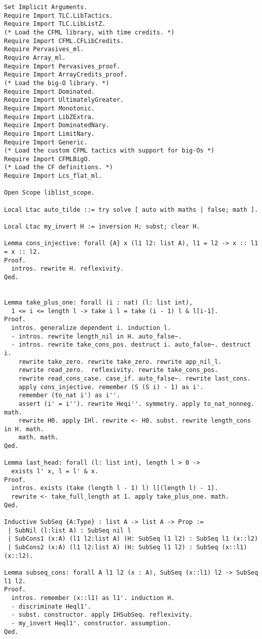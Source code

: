 \begin{verbatim}
Set Implicit Arguments.
Require Import TLC.LibTactics.
Require Import TLC.LibListZ.
(* Load the CFML library, with time credits. *)
Require Import CFML.CFLibCredits.
Require Pervasives_ml.
Require Array_ml.
Require Import Pervasives_proof.
Require Import ArrayCredits_proof.
(* Load the big-O library. *)
Require Import Dominated.
Require Import UltimatelyGreater.
Require Import Monotonic.
Require Import LibZExtra.
Require Import DominatedNary.
Require Import LimitNary.
Require Import Generic.
(* Load the custom CFML tactics with support for big-Os *)
Require Import CFMLBigO.
(* Load the CF definitions. *)
Require Import Lcs_flat_ml.

Open Scope liblist_scope.

Local Ltac auto_tilde ::= try solve [ auto with maths | false; math ].

Local Ltac my_invert H := inversion H; subst; clear H.

Lemma cons_injective: forall {A} x (l1 l2: list A), l1 = l2 -> x :: l1 = x :: l2. 
Proof.
  intros. rewrite H. reflexivity. 
Qed.


Lemma take_plus_one: forall (i : nat) (l: list int), 
  1 <= i <= length l -> take i l = take (i - 1) l & l[i-1]. 
Proof.
  intros. generalize dependent i. induction l. 
  - intros. rewrite length_nil in H. auto_false~. 
  - intros. rewrite take_cons_pos. destruct i. auto_false~. destruct i. 
    rewrite take_zero. rewrite take_zero. rewrite app_nil_l. 
    rewrite read_zero.  reflexivity. rewrite take_cons_pos. 
    rewrite read_cons_case. case_if. auto_false~. rewrite last_cons. 
    apply cons_injective. remember (S (S i) - 1) as i'. 
    remember (to_nat i') as i''. 
    assert (i' = i''). rewrite Heqi''. symmetry. apply to_nat_nonneg. math. 
    rewrite H0. apply IHl. rewrite <- H0. subst. rewrite length_cons in H. math. 
    math. math. 
Qed.

Lemma last_head: forall (l: list int), length l > 0 -> 
  exists l' x, l = l' & x. 
Proof.
  intros. exists (take (length l - 1) l) l[(length l) - 1]. 
  rewrite <- take_full_length at 1. apply take_plus_one. math. 
Qed.

Inductive SubSeq {A:Type} : list A -> list A -> Prop :=
 | SubNil (l:list A) : SubSeq nil l
 | SubCons1 (x:A) (l1 l2:list A) (H: SubSeq l1 l2) : SubSeq l1 (x::l2)
 | SubCons2 (x:A) (l1 l2:list A) (H: SubSeq l1 l2) : SubSeq (x::l1) (x::l2).

Lemma subseq_cons: forall A l1 l2 (x : A), SubSeq (x::l1) l2 -> SubSeq l1 l2. 
Proof.
  intros. remember (x::l1) as l1'. induction H. 
  - discriminate Heql1'. 
  - subst. constructor. apply IHSubSeq. reflexivity. 
  - my_invert Heql1'. constructor. assumption. 
Qed.


\end{verbatim}
